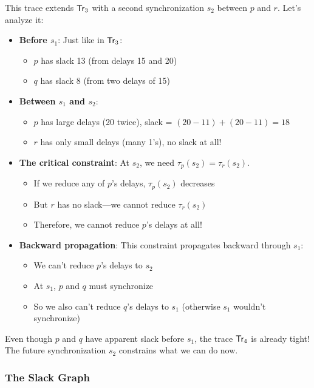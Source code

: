 This trace extends $\textsf{Tr}_3$ with a second synchronization $s_2$ between $p$ and $r$. Let's analyze it:

\begin{itemize}
\item \textbf{Before $s_1$}: Just like in $\textsf{Tr}_3$:
  \begin{itemize}
  \item $p$ has slack 13 (from delays 15 and 20)
  \item $q$ has slack 8 (from two delays of 15)
  \end{itemize}

\item \textbf{Between $s_1$ and $s_2$}:
  \begin{itemize}
  \item $p$ has large delays (20 twice), slack = $(20-11) + (20-11) = 18$
  \item $r$ has only small delays (many 1's), no slack at all!
  \end{itemize}

\item \textbf{The critical constraint}: At $s_2$, we need $\tau_p(s_2) = \tau_r(s_2)$. 
  \begin{itemize}
  \item If we reduce any of $p$'s delays, $\tau_p(s_2)$ decreases
  \item But $r$ has no slack---we cannot reduce $\tau_r(s_2)$
  \item Therefore, we cannot reduce $p$'s delays at all!
  \end{itemize}

\item \textbf{Backward propagation}: This constraint propagates backward through $s_1$:
  \begin{itemize}
  \item We can't reduce $p$'s delays to $s_2$
  \item At $s_1$, $p$ and $q$ must synchronize
  \item So we also can't reduce $q$'s delays to $s_1$ (otherwise $s_1$ wouldn't synchronize)
  \end{itemize}
\end{itemize}

Even though $p$ and $q$ have apparent slack before $s_1$, the trace $\textsf{Tr}_4$ is already tight! The future synchronization $s_2$ constrains what we can do now.

\subsubsection{The Slack Graph}

